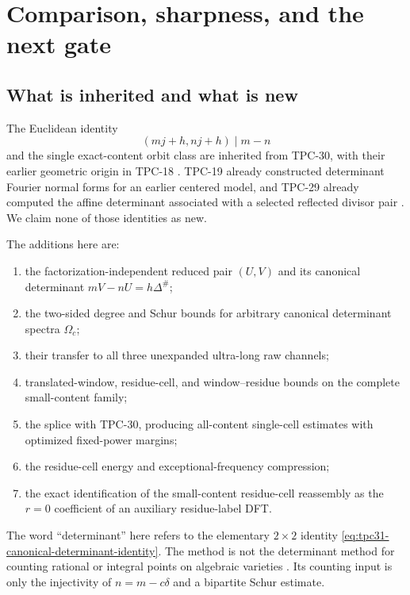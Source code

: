 \section{Comparison, sharpness, and the next gate}
\label{sec:tpc31-comparison}

\subsection{What is inherited and what is new}

The Euclidean identity
\[
 (mj+h,nj+h)\mid m-n
\]
and the single exact-content orbit class are inherited from TPC-30,
with their earlier geometric origin in TPC-18
\citep{WangTPC18,WangTPC30}.  TPC-19 already constructed determinant
Fourier normal forms for an earlier centered model, and TPC-29 already
computed the affine determinant associated with a selected reflected
divisor pair \citep{WangTPC19,WangTPC29}.  We claim none of those
identities as new.

The additions here are:
\begin{enumerate}[label=\textup{(\roman*)}]
 \item the factorization-independent reduced pair
 $(U,V)$ and its canonical determinant
 $mV-nU=h\Delta^\#$;
 \item the two-sided degree and Schur bounds for arbitrary canonical
 determinant spectra $\Omega_c$;
 \item their transfer to all three unexpanded ultra-long raw channels;
 \item translated-window, residue-cell, and window--residue bounds on
 the complete small-content family;
 \item the splice with TPC-30, producing all-content single-cell
 estimates with optimized fixed-power margins;
 \item the residue-cell energy and exceptional-frequency compression;
 \item the exact identification of the small-content residue-cell
 reassembly as the $r=0$ coefficient of an auxiliary residue-label
 DFT.
\end{enumerate}

The word ``determinant'' here refers to the elementary $2\times2$
identity \eqref{eq:tpc31-canonical-determinant-identity}.  The method
is not the determinant method for counting rational or integral points
on algebraic varieties \citep{HeathBrown2002Determinant}.  Its counting
input is only the injectivity of $n=m-c\delta$ and a bipartite Schur
estimate.

